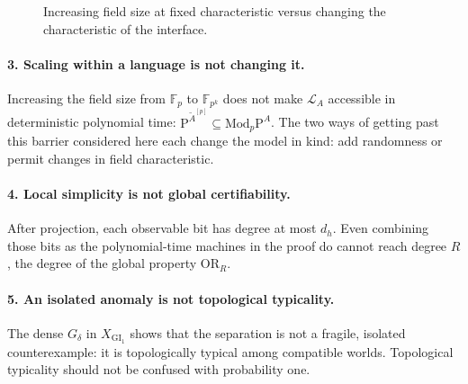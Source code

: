 \documentclass[11pt,a4paper]{article}
\newcommand{\F}{\mathbb F}
\newcommand{\MP}[1]{\mathrm{Mod}_{#1}\mathrm P}
\newcommand{\LA}{\mathcal L_A}
\newcommand{\GI}{\mathrm{GI}_1}
\newcommand{\OR}{\mathrm{OR}}
\begin{document}
\begin{figure}[htbp]\centering
{}
\caption{Increasing field size at fixed characteristic versus changing the characteristic of the interface.}
\end{figure}

\paragraph{3. Scaling within a language is not changing it.}
Increasing the field size from \(\F_p\) to \(\F_{p^k}\) does not make \(\LA\) accessible in deterministic polynomial time: \(\mathrm P^{\widetilde A^{[p]}}\subseteq\MP p^A\). The two ways of getting past this barrier considered here each change the model in kind: add randomness or permit changes in field characteristic.

\paragraph{4. Local simplicity is not global certifiability.}
After projection, each observable bit has degree at most \(d_h\). Even combining those bits as the polynomial-time machines in the proof do cannot reach degree \(R\), the degree of the global property \(\OR_R\).

\paragraph{5. An isolated anomaly is not topological typicality.}
The dense \(G_\delta\) in \(X_{\GI}\) shows that the separation is not a fragile, isolated counterexample: it is topologically typical among compatible worlds. Topological typicality should not be confused with probability one.
\end{document}
